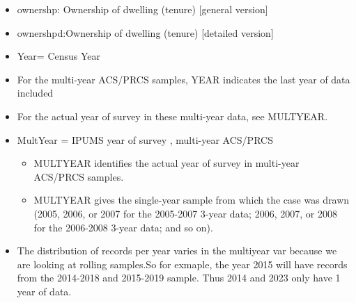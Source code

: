 \documentclass[
]{article}
\newenvironment{Shaded}{\begin{snugshade}}{\end{snugshade}}
\newcommand{\CommentTok}[1]{\textcolor[rgb]{0.56,0.35,0.01}{\textit{#1}}}
\newcommand{\FunctionTok}[1]{\textcolor[rgb]{0.13,0.29,0.53}{\textbf{#1}}}
\newcommand{\NormalTok}[1]{#1}
\newcommand{\SpecialCharTok}[1]{\textcolor[rgb]{0.81,0.36,0.00}{\textbf{#1}}}
\providecommand{\tightlist}{%
  \setlength{\itemsep}{0pt}\setlength{\parskip}{0pt}}
\begin{document}
\begin{itemize}
\item
  ownershp: Ownership of dwelling (tenure) {[}general version{]}
\item
  ownershpd:Ownership of dwelling (tenure) {[}detailed version{]}
\item
  Year= Census Year
\item
  For the multi-year ACS/PRCS samples, YEAR indicates the last year of
  data included
\item
  For the actual year of survey in these multi-year data, see MULTYEAR.
\item
  MultYear = IPUMS year of survey , multi-year ACS/PRCS

  \begin{itemize}
  \tightlist
  \item
    MULTYEAR identifies the actual year of survey in multi-year ACS/PRCS
    samples.
  \item
    MULTYEAR gives the single-year sample from which the case was drawn
    (2005, 2006, or 2007 for the 2005-2007 3-year data; 2006, 2007, or
    2008 for the 2006-2008 3-year data; and so on).
  \end{itemize}
\item
  The distribution of records per year varies in the multiyear var
  because we are looking at rolling samples.So for exmaple, the year
  2015 will have records from the 2014-2018 and 2015-2019 sample. Thus
  2014 and 2023 only have 1 year of data.
\end{itemize}

\begin{Shaded}
\end{Shaded}
\end{document}
